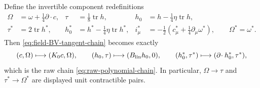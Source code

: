 \documentclass[11pt]{article}
\theoremstyle{definition}
\theoremstyle{remark}
\begin{document}
Define the invertible component redefinitions
\begin{align}\label{eq:field-raw-redefinitions}
 \Omega&=\omega+\frac14\partial\!\cdot c,
 &\tau&=\frac18\operatorname{tr}h,
 &h_0&=h-\frac14\eta\operatorname{tr}h,\nonumber\\
 \tau^*&=2\operatorname{tr}h^*,
 &h_0^*&=h^*-\frac14\eta\operatorname{tr}h^*,
 &i^*_\mu&=-\frac12\left(c^*_\mu+\frac14\partial_\mu\omega^*\right),
 \qquad \Omega^*=\omega^*.
\end{align}
Then \eqref{eq:field-BV-tangent-chain} becomes exactly
\begin{equation}
 (c,\Omega)\longmapsto(K_0c,\Omega),\qquad
 (h_0,\tau)\longmapsto(B_{\rm lin}h_0,0),\qquad
 (h_0^*,\tau^*)\longmapsto(\partial\!\cdot h_0^*,\tau^*),
\end{equation}
which is the raw chain \eqref{eq:raw-polynomial-chain}.  In particular,
$\Omega\to\tau$ and $\tau^*\to\Omega^*$ are displayed unit contractible
pairs.
\end{document}
